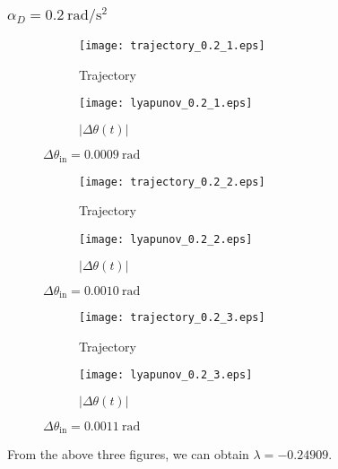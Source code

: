 \documentclass[a4paper]{article}
\begin{document}
	\subsubsection{$\alpha _D = 0.2\mathrm{~rad/s^2}$}
	\begin{figure}[H]
		\centering
		\begin{subfigure}{0.85\textwidth}
		\texttt{[image: trajectory\_0.2\_1.eps]}
		\caption{Trajectory}	
		\end{subfigure}
		\begin{subfigure}{0.85\textwidth}
		\texttt{[image: lyapunov\_0.2\_1.eps]}
		\caption{$|\Delta\theta(t)|$}	
		\end{subfigure}
		\caption{$\Delta\theta_{\mathrm{in}} = 0.0009\mathrm{~rad}$}
	\end{figure}
	\newpage
	\begin{figure}[H]
		\centering
		\begin{subfigure}{0.85\textwidth}
		\texttt{[image: trajectory\_0.2\_2.eps]}
		\caption{Trajectory}	
		\end{subfigure}
		\begin{subfigure}{0.85\textwidth}
		\texttt{[image: lyapunov\_0.2\_2.eps]}
		\caption{$|\Delta\theta(t)|$}	
		\end{subfigure}
		\caption{$\Delta\theta_{\mathrm{in}} = 0.0010\mathrm{~rad}$}
	\end{figure}
	\newpage
	\begin{figure}[H]
		\centering
		\begin{subfigure}{0.85\textwidth}
		\texttt{[image: trajectory\_0.2\_3.eps]}
		\caption{Trajectory}	
		\end{subfigure}
		\begin{subfigure}{0.85\textwidth}
		\texttt{[image: lyapunov\_0.2\_3.eps]}
		\caption{$|\Delta\theta(t)|$}	
		\end{subfigure}
		\caption{$\Delta\theta_{\mathrm{in}} = 0.0011\mathrm{~rad}$}
	\end{figure}
	From the above three figures, we can obtain $\lambda = -0.24909$.
	\newpage
\end{document}
